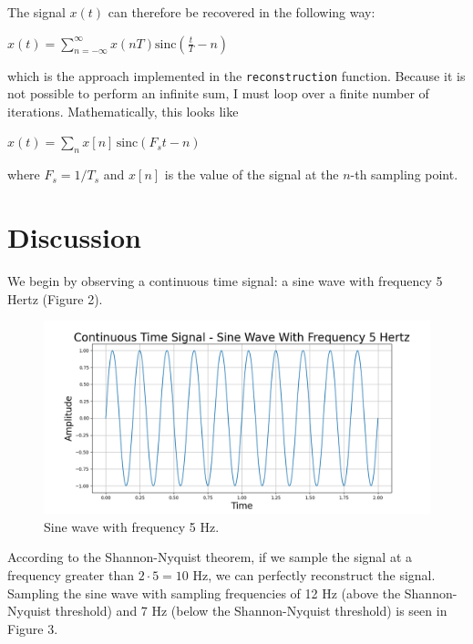 \documentclass{article}
\begin{document}
The signal $x(t)$ can therefore be recovered in the following way:
\begin{center}
    \begin{math}
        x(t) = \displaystyle\sum_{n=-\infty}^{\infty} x(nT) \text{sinc}\left( \frac{t}{T} - n \right)
    \end{math}  
\end{center}
which is the approach implemented in the \verb|reconstruction| function. Because it is not possible to perform an infinite sum, I must loop over a finite number of iterations. Mathematically, this looks like
\begin{center}
    \begin{math}
        x(t) = \displaystyle\sum_{n}^{} x[n]\, \text{sinc}\left( F_st - n \right)
    \end{math}  
\end{center}
where $F_s = 1/T_s$ and $x[n]$ is the value of the signal at the $n$-th sampling point.

\section{Discussion}


We begin by observing a continuous time signal: a sine wave with frequency 5 Hertz (Figure 2). 
\begin{figure}[H]
    \includegraphics[width=\linewidth]{images/sinewave_5hz.png}
    \caption{Sine wave with frequency 5 Hz.}
    \label{fig:enter-label}
\end{figure}
According to the Shannon-Nyquist theorem, if we sample the signal at a frequency greater than $2\cdot 5 = 10$ Hz, we can perfectly reconstruct the signal.
Sampling the sine wave with sampling frequencies of 12 Hz (above the Shannon-Nyquist threshold) and 7 Hz (below the Shannon-Nyquist threshold) is seen in Figure 3.
\end{document}
